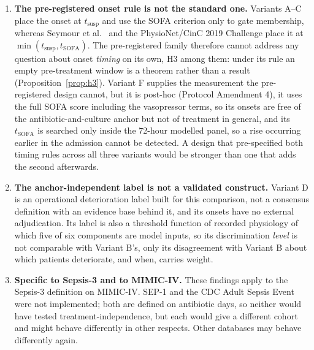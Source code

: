 \begin{enumerate}
    \item \textbf{The pre-registered onset rule is not the standard one.}
    Variants A--C place the onset at $t_{\text{susp}}$ and use the SOFA
    criterion only to gate membership, whereas Seymour et al.\
    \cite{seymour2016assessment} and the PhysioNet/CinC 2019 Challenge
    \cite{reyna2020utility} place it at
    $\min(t_{\text{susp}}, t_{\text{SOFA}})$. The pre-registered family
    therefore cannot address any question about onset \emph{timing} on its own,
    H3 among them: under its rule an empty pre-treatment window is a theorem
    rather than a result (Proposition~\ref{prop:h3}). Variant F supplies the
    measurement the pre-registered design cannot, but it is post-hoc (Protocol
    Amendment 4), it uses the full SOFA score including the vasopressor terms, so its onsets are free of the antibiotic-and-culture anchor but not of
    treatment in general, and its $t_{\text{SOFA}}$ is searched only inside
    the 72-hour modelled panel, so a rise occurring earlier in the admission
    cannot be detected. A design that pre-specified both timing rules across all
    three variants would be stronger than one that adds the second afterwards.

    \item \textbf{The anchor-independent label is not a validated construct.}
    Variant D is an operational deterioration label built for this comparison,
    not a consensus definition with an evidence base behind it, and its onsets
    have no external adjudication. Its label is also a threshold function of
    recorded physiology of which five of six components are model inputs, so
    its discrimination \emph{level} is not comparable with Variant B's, only
    its disagreement with Variant B about which patients deteriorate, and when,
    carries weight.

    \item \textbf{Specific to Sepsis-3 and to MIMIC-IV.} These findings apply
    to the Sepsis-3 definition on MIMIC-IV. SEP-1 and the CDC Adult Sepsis Event
    were not implemented; both are defined on antibiotic days, so neither would
    have tested treatment-independence, but each would give a different cohort
    and might behave differently in other respects. Other databases may behave
    differently again.


\end{enumerate}
